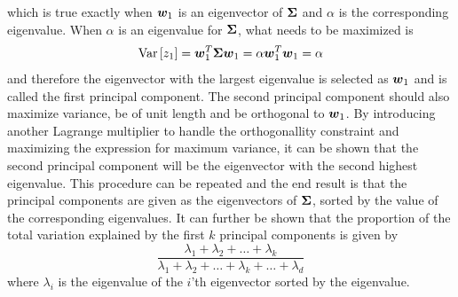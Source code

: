 which is true exactly when $\boldsymbol{w}_1$ is an eigenvector of $\boldsymbol{\Sigma}$ and $\alpha$ is the corresponding eigenvalue. When $\alpha$ is an eigenvalue for $\boldsymbol{\Sigma}$, what needs to be maximized is
\[
    \text{Var}\,[z_1] = \boldsymbol{w}_1^T\boldsymbol{\Sigma}\boldsymbol{w}_1 = \alpha\boldsymbol{w}_1^T\boldsymbol{w}_1 = \alpha
\]
and therefore the eigenvector with the largest eigenvalue is selected as $\boldsymbol{w}_1$ and is called the first principal component. The second principal component should also maximize variance, be of unit length and be orthogonal to $\boldsymbol{w}_1$. By introducing another Lagrange multiplier to handle the orthogonallity constraint and maximizing the expression for maximum variance, it can be shown that the second principal component will be the eigenvector with the second highest eigenvalue. This procedure can be repeated and the end result is that the principal components are given as the eigenvectors of $\boldsymbol{\Sigma}$, sorted by the value of the corresponding eigenvalues. It can further be shown that the proportion of the total variation explained by the first $k$ principal components is given by
\begin{equation}\label{eq:variance-explained}
    \frac{\lambda_1+\lambda_2 +\dots + \lambda_k}{\lambda_1 + \lambda_2 + \dots + \lambda_k + \dots + \lambda_d}
\end{equation}
where $\lambda_i$ is the eigenvalue of the $i$'th eigenvector sorted by the eigenvalue.


